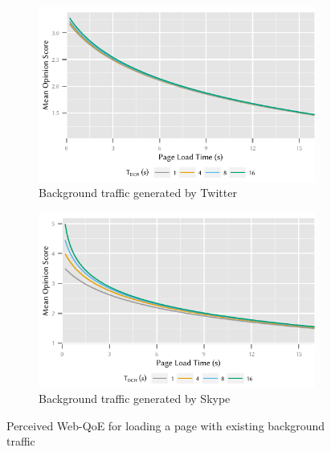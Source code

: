 \begin{figure}
	\begin{subfigure}[b]{\textwidth}
	\centering
	\includegraphics{network/network_traces/numerical_results/figures/qoe_with_backgroundapp_twitter}
	\caption{Background traffic generated by Twitter}\label{fig:network:network_traces:numerical_results:web_qoe:twitter}
	\end{subfigure} 

	\begin{subfigure}[b]{\textwidth}
	\centering
	\includegraphics{network/network_traces/numerical_results/figures/qoe_with_backgroundapp_skype}
	\caption{Background traffic generated by Skype}\label{fig:network:network_traces:numerical_results:web_qoe:skype}
	\end{subfigure}

	\caption{Perceived Web-\gls{QoE} for loading a page with existing background traffic}\label{fig:network:network_traces:numerical_results:web_qoe}
\end{figure}

